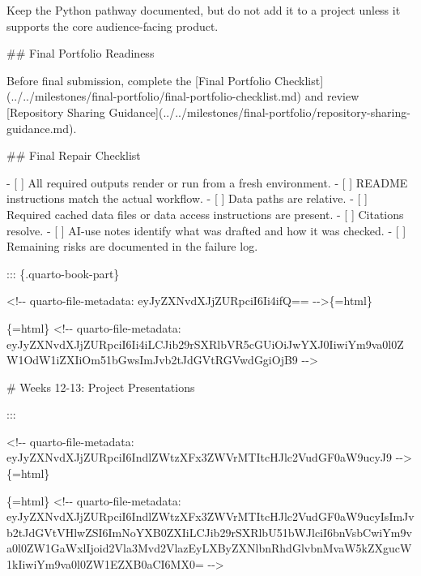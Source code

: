\documentclass[
  letterpaper,
  DIV=11,
  numbers=noendperiod,
  oneside]{scrreprt}
\newenvironment{Shaded}{\begin{snugshade}}{\end{snugshade}}
\newcommand{\CommentTok}[1]{\textcolor[rgb]{0.37,0.37,0.37}{#1}}
\newcommand{\FunctionTok}[1]{\textcolor[rgb]{0.28,0.35,0.67}{#1}}
\newcommand{\InformationTok}[1]{\textcolor[rgb]{0.37,0.37,0.37}{#1}}
\newcommand{\NormalTok}[1]{\textcolor[rgb]{0.00,0.23,0.31}{#1}}
\newcommand{\OtherTok}[1]{\textcolor[rgb]{0.00,0.23,0.31}{#1}}
\newcommand{\SpecialStringTok}[1]{\textcolor[rgb]{0.13,0.47,0.30}{#1}}
\newcommand{\VariableTok}[1]{\textcolor[rgb]{0.07,0.07,0.07}{#1}}
\begin{document}
\begin{Shaded}
\begin{Highlighting}[numbers=left,,]
\NormalTok{Keep the Python pathway documented, but do not add it to a project unless it supports the core audience{-}facing product.}

\FunctionTok{\#\# Final Portfolio Readiness}

\NormalTok{Before final submission, complete the }\CommentTok{[}\OtherTok{Final Portfolio Checklist}\CommentTok{](../../milestones/final{-}portfolio/final{-}portfolio{-}checklist.md)}\NormalTok{ and review }\CommentTok{[}\OtherTok{Repository Sharing Guidance}\CommentTok{](../../milestones/final{-}portfolio/repository{-}sharing{-}guidance.md)}\NormalTok{.}

\FunctionTok{\#\# Final Repair Checklist}

\SpecialStringTok{{-} }\VariableTok{[ ]}\NormalTok{ All required outputs render or run from a fresh environment.}
\SpecialStringTok{{-} }\VariableTok{[ ]}\NormalTok{ README instructions match the actual workflow.}
\SpecialStringTok{{-} }\VariableTok{[ ]}\NormalTok{ Data paths are relative.}
\SpecialStringTok{{-} }\VariableTok{[ ]}\NormalTok{ Required cached data files or data access instructions are present.}
\SpecialStringTok{{-} }\VariableTok{[ ]}\NormalTok{ Citations resolve.}
\SpecialStringTok{{-} }\VariableTok{[ ]}\NormalTok{ AI{-}use notes identify what was drafted and how it was checked.}
\SpecialStringTok{{-} }\VariableTok{[ ]}\NormalTok{ Remaining risks are documented in the failure log.}


\NormalTok{::: \{.quarto{-}book{-}part\}}


\InformationTok{\textasciigrave{}\textless{}!{-}{-} quarto{-}file{-}metadata: eyJyZXNvdXJjZURpciI6Ii4ifQ== {-}{-}\textgreater{}\textasciigrave{}}\NormalTok{\{=html\}}

\InformationTok{\textasciigrave{}\textasciigrave{}\textasciigrave{}\{=html\}}
\InformationTok{\textless{}!{-}{-} quarto{-}file{-}metadata: eyJyZXNvdXJjZURpciI6Ii4iLCJib29rSXRlbVR5cGUiOiJwYXJ0IiwiYm9va0l0ZW1OdW1iZXIiOm51bGwsImJvb2tJdGVtRGVwdGgiOjB9 {-}{-}\textgreater{}}
\InformationTok{\textasciigrave{}\textasciigrave{}\textasciigrave{}}

\FunctionTok{\# Weeks 12{-}13: Project Presentations}


\NormalTok{:::}



\InformationTok{\textasciigrave{}\textless{}!{-}{-} quarto{-}file{-}metadata: eyJyZXNvdXJjZURpciI6IndlZWtzXFx3ZWVrMTItcHJlc2VudGF0aW9ucyJ9 {-}{-}\textgreater{}\textasciigrave{}}\NormalTok{\{=html\}}

\InformationTok{\textasciigrave{}\textasciigrave{}\textasciigrave{}\{=html\}}
\InformationTok{\textless{}!{-}{-} quarto{-}file{-}metadata: eyJyZXNvdXJjZURpciI6IndlZWtzXFx3ZWVrMTItcHJlc2VudGF0aW9ucyIsImJvb2tJdGVtVHlwZSI6ImNoYXB0ZXIiLCJib29rSXRlbU51bWJlciI6bnVsbCwiYm9va0l0ZW1GaWxlIjoid2Vla3Mvd2VlazEyLXByZXNlbnRhdGlvbnMvaW5kZXgucW1kIiwiYm9va0l0ZW1EZXB0aCI6MX0= {-}{-}\textgreater{}}
\InformationTok{\textasciigrave{}\textasciigrave{}\textasciigrave{}}


\end{Highlighting}
\end{Shaded}
\end{document}
